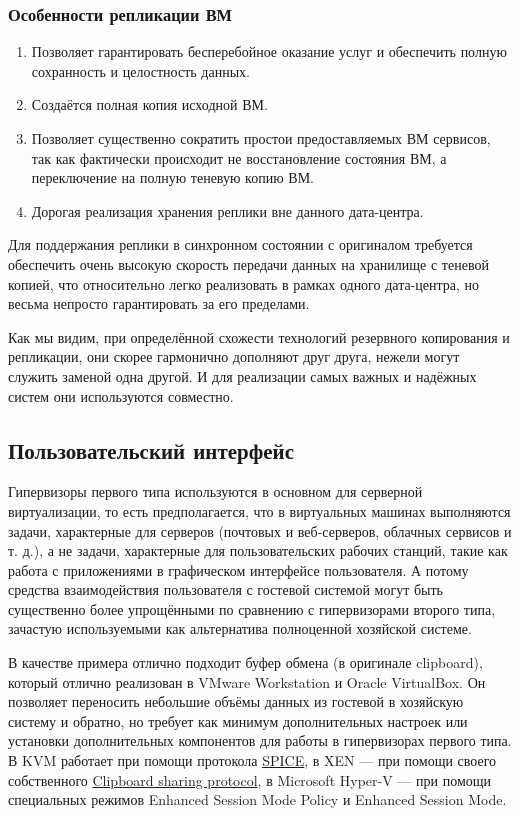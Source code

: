 \documentclass[14pt, a4paper]{article}
\begin{document}
\subsubsection*{Особенности репликации ВМ}

\begin{enumerate}
    \item Позволяет гарантировать бесперебойное оказание услуг и обеспечить полную сохранность и
    целостность данных.
    \item Создаётся полная копия исходной ВМ.
    \item Позволяет существенно сократить простои предоставляемых ВМ сервисов, так как фактически
    происходит не восстановление состояния ВМ, а переключение на полную теневую копию ВМ.
    \item Дорогая реализация хранения реплики вне данного дата-центра.
\end{enumerate}

Для поддержания реплики в синхронном состоянии с оригиналом требуется обеспечить очень
высокую скорость передачи данных на хранилище с теневой копией, что относительно легко
реализовать в рамках одного дата-центра, но весьма непросто гарантировать за его пределами.

Как мы видим, при определённой схожести технологий резервного копирования и репликации, они
скорее гармонично дополняют друг друга, нежели могут служить заменой одна другой. И для
реализации самых важных и надёжных систем они используются совместно.

\subsection*{Пользовательский интерфейс}

Гипервизоры первого типа используются в основном для серверной виртуализации, то есть
предполагается, что в виртуальных машинах выполняются задачи, характерные для серверов
(почтовых и веб-серверов, облачных сервисов и т. д.), а не задачи, характерные для пользовательских
рабочих станций, такие как работа с приложениями в графическом интерфейсе пользователя. А
потому средства взаимодействия пользователя с гостевой системой могут быть существенно более
упрощёнными по сравнению с гипервизорами второго типа, зачастую используемыми как
альтернатива полноценной хозяйской системе.

В качестве примера отлично подходит буфер обмена (в оригинале clipboard), который отлично
реализован в VMware Workstation и Oracle VirtualBox. Он позволяет переносить небольшие объёмы
данных из гостевой в хозяйскую систему и обратно, но требует как минимум дополнительных настроек
или установки дополнительных компонентов для работы в гипервизорах первого типа. В KVM
работает при помощи протокола \href{https://ru.wikipedia.org/wiki/SPICE_(протокол)}{SPICE}, в XEN — при помощи своего собственного 
\href{https://wiki.xenproject.org/wiki/Clipboard_sharing_protocol}{Clipboard sharing protocol}, в Microsoft Hyper-V — при помощи специальных режимов Enhanced Session Mode Policy и
Enhanced Session Mode.
\end{document}

